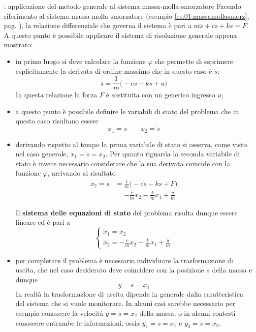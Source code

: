  	\begin{esempio}{: applicazione del metodo generale al sistema massa-molla-smorzatore}
 		Facendo riferimento al sistema massa-molla-smorzatore (esempio \ref{es:01:massamollasmorz}, pag. \pageref{es:01:massamollasmorz}), la relazione differenziale che governa il sistema è pari a $m\ddot s + c\dot s + k s = F$. A questo punto è possibile applicare il sistema di risoluzione generale appena mostrato:
 		\begin{itemize}
 			\item in primo luogo si deve calcolare la funzione $\varphi$ che permette di esprimere esplicitamente la derivata di ordine massimo che in questo caso è $\ddot s$:
 			\[ \ddot s = \frac 1 m \Big(-c \dot s - ks + u\Big)  \]
 			In questa relazione la forza $F$ è sostituita con un generico ingresso $u$;
 			
 			\item a questo punto è possibile definire le variabili di stato del problema che in questo caso risultano essere
 			\[ x_1 = s \qquad x_2 = \dot s \]
 			
 			\item derivando rispetto al tempo la prima variabile di stato si osserva, come visto nel caso generale, $\dot x_1 = \dot s = x_2$. Per quanto riguarda la seconda variabile di stato è invece necessario considerare che la sua derivata coincide con la funzione $\varphi$, arrivando al risultato 
 			\begin{align*}
 				\dot x_2 = \ddot s & = \frac 1 m \Big(-c\dot s -ks + F\Big) \\ 
 				& = -\frac c m x_2 - \frac k m x_1 + \frac u m
 			\end{align*}
 			
 			Il \textbf{sistema delle equazioni di stato} del problema risulta dunque essere lineare ed è pari a 
 			\[ \begin{cases}
 				\dot x_1 = x_2 \\ 
 				\dot x_2 = - \frac c m x_2 - \frac k m x_1 + \frac u m
 			\end{cases}  \]
 			
 			\item per completare il problema è necessario individuare la trasformazione di uscita, che nel caso desiderato deve coincidere con la posizione $s$ della massa e dunque
 			\[ y = s = x_1 \]
 			In realtà la trasformazione di uscita dipende in generale dalla caratteristica del sistema che si vuole monitorare. In alcuni casi sarebbe necessario per esempio conoscere la velocità $y = \dot s = x_2$ della massa, o in alcuni contesti conoscere entrambe le informazioni, ossia $y_1 = s = x_1$ e $y_2 = \dot s = x_2$.
 			

\end{itemize}
\end{esempio}
